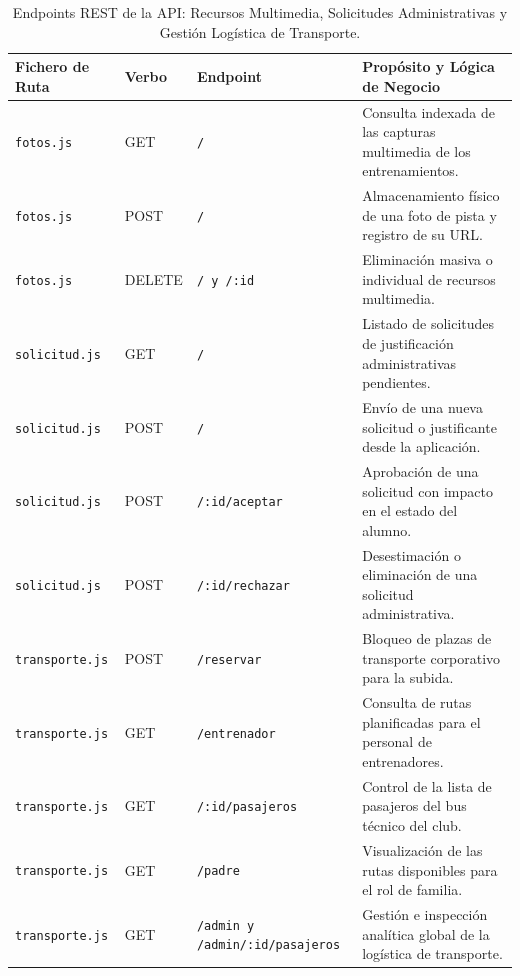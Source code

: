         \begin{table}[htbp]
        \centering
        \scriptsize
        \renewcommand{\arraystretch}{0.95}
        \begin{tabularx}{\textwidth}{|l|l|l|X|}
        \hline
        \rowcolor[HTML]{EFEFEF} 
        \textbf{Fichero de Ruta} & \textbf{Verbo} & \textbf{Endpoint} & \textbf{Propósito y Lógica de Negocio} \\ \hline
        \texttt{fotos.js} & GET & \texttt{/} & Consulta indexada de las capturas multimedia de los entrenamientos. \\ \hline
        \texttt{fotos.js} & POST & \texttt{/} & Almacenamiento físico de una foto de pista y registro de su URL. \\ \hline
        \texttt{fotos.js} & DELETE & \texttt{/ y /:id} & Eliminación masiva o individual de recursos multimedia. \\ \hline
        \texttt{solicitud.js} & GET & \texttt{/} & Listado de solicitudes de justificación administrativas pendientes. \\ \hline
        \texttt{solicitud.js} & POST & \texttt{/} & Envío de una nueva solicitud o justificante desde la aplicación. \\ \hline
        \texttt{solicitud.js} & POST & \texttt{/:id/aceptar} & Aprobación de una solicitud con impacto en el estado del alumno. \\ \hline
        \texttt{solicitud.js} & POST & \texttt{/:id/rechazar} & Desestimación o eliminación de una solicitud administrativa. \\ \hline
        \texttt{transporte.js} & POST & \texttt{/reservar} & Bloqueo de plazas de transporte corporativo para la subida. \\ \hline
        \texttt{transporte.js} & GET & \texttt{/entrenador} & Consulta de rutas planificadas para el personal de entrenadores. \\ \hline
        \texttt{transporte.js} & GET & \texttt{/:id/pasajeros} & Control de la lista de pasajeros del bus técnico del club. \\ \hline
        \texttt{transporte.js} & GET & \texttt{/padre} & Visualización de las rutas disponibles para el rol de familia. \\ \hline
        \texttt{transporte.js} & GET & \texttt{/admin y /admin/:id/pasajeros} & Gestión e inspección analítica global de la logística de transporte. \\ \hline
        \end{tabularx}
        \caption{Endpoints REST de la API: Recursos Multimedia, Solicitudes Administrativas y Gestión Logística de Transporte.}
        \label{tab:endpoints_gestion}
        \end{table}

